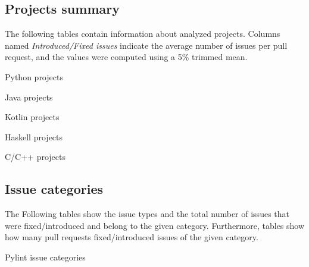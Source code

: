 \documentclass[digital,oneside,oldtable,nolof,nolot,nocover]{fithesis4}
\begin{document}
\subsection*{Projects summary}
\label{sec:org8bcc39a}
The following tables contain information about analyzed projects. Columns named \emph{Introduced/Fixed issues} indicate
the average number of issues per pull request, and the values were computed using a 5\% trimmed mean.

\begin{table}[H]
\caption{Python projects}
\centering
\begingroup\scriptsize

\endgroup
\end{table}

\begin{table}[H]
\caption{Java projects}
\centering
\begingroup\scriptsize

\endgroup
\end{table}

\newpage
\noindent\begin{minipage}{\textwidth}
  \begin{table}[H]
  \caption{Kotlin projects}
  \centering
  \begingroup\scriptsize
  
  \endgroup
  \end{table}

  \begin{table}[H]
  \caption{Haskell projects}
  \centering
  \begingroup\scriptsize
  
  \endgroup
  \end{table}
\end{minipage}
\newpage

\begin{table}[H]
\caption{C/C++ projects}
\centering
\begingroup\scriptsize

\endgroup
\end{table}

\FloatBarrier
\subsection*{Issue categories}
\label{sec:org1e9c608}
The Following tables show the issue types and the total number of issues that
were fixed/introduced and belong to the given category. Furthermore, tables
show how many pull requests fixed/introduced issues of the given category.
\begin{table}[H]
\caption{Pylint issue categories}
\centering
\begingroup\scriptsize

\endgroup
\end{table}
\end{document}
